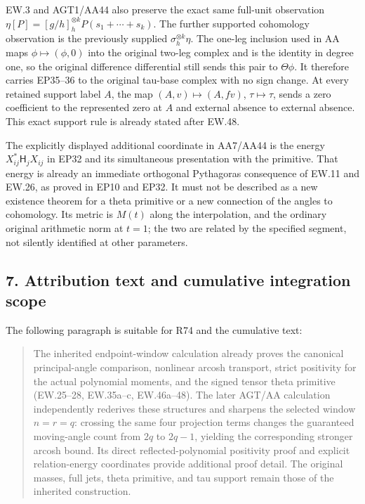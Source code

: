 EW.3 and AGT1/AA44 also preserve the exact same full-unit observation \(\eta[P]=[g/h]_h^{\otimes k}P(s_1+\cdots+s_k)\). The further supported cohomology observation is the previously supplied \(\sigma_h^{\otimes k}\eta\). The one-leg inclusion used in AA maps \(\phi\mapsto(\phi,0)\) into the original two-leg complex and is the identity in degree one, so the original difference differential still sends this pair to \(\Theta\phi\). It therefore carries EP35--36 to the original tau-base complex with no sign change. At every retained support label \(A\), the map \((A,v)\mapsto(A,fv)\), \(\tau\mapsto\tau\), sends a zero coefficient to the represented zero at \(A\) and external absence to external absence. This exact support rule is already stated after EW.48.

The explicitly displayed additional coordinate in AA7/AA44 is the energy \(X_{ij}^*\mathsf H_jX_{ij}\) in EP32 and its simultaneous presentation with the primitive. That energy is already an immediate orthogonal Pythagoras consequence of EW.11 and EW.26, as proved in EP10 and EP32. It must not be described as a new existence theorem for a theta primitive or a new connection of the angles to cohomology. Its metric is \(M(t)\) along the interpolation, and the ordinary original arithmetic norm at \(t=1\); the two are related by the specified segment, not silently identified at other parameters.

\subsection{7. Attribution text and cumulative integration scope}\label{GraphV2:attribution-text-and-cumulative-integration-scope}

The following paragraph is suitable for R74 and the cumulative text:

\begin{quote}
The inherited endpoint-window calculation already proves the canonical principal-angle comparison, nonlinear arcosh transport, strict positivity for the actual polynomial moments, and the signed tensor theta primitive (EW.25--28, EW.35a--c, EW.46a--48). The later AGT/AA calculation independently rederives these structures and sharpens the selected window \(n=r=q\): crossing the same four projection terms changes the guaranteed moving-angle count from \(2q\) to \(2q-1\), yielding the corresponding stronger arcosh bound. Its direct reflected-polynomial positivity proof and explicit relation-energy coordinates provide additional proof detail. The original masses, full jets, theta primitive, and tau support remain those of the inherited construction.
\end{quote}


